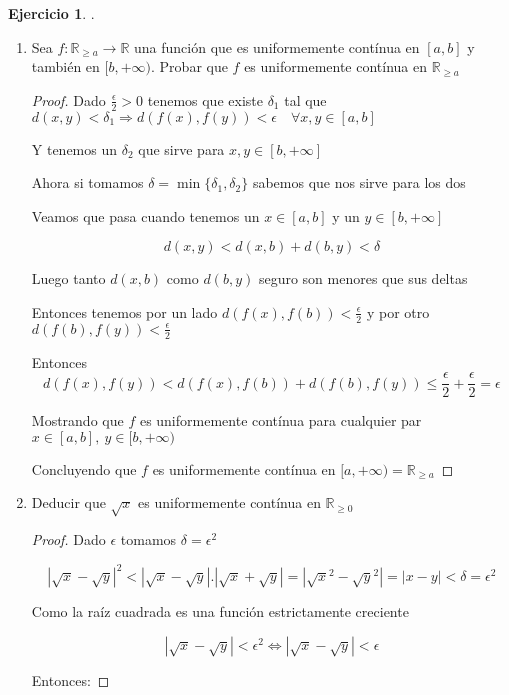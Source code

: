 \documentclass[11pt]{report}
\newcommand{\R}{\mathbb{R}}
\newcommand{\Ra}{\Rightarrow}
\newcommand{\ra}{\rightarrow}
\theoremstyle{definition}
\newtheorem{ej}{Ejercicio}
\begin{document}
	\begin{ej}.
		\begin{enumerate}
			\item Sea $f : \R_{\geq a} \ra \R$ una función que es uniformemente contínua en $[a,b]$ y también en $[b,+\infty )$. Probar que $f$ es uniformemente contínua en $\R_{\geq a}$
				\begin{proof}
					Dado $\frac{\epsilon}{2} >0$ tenemos que existe $\delta_1$ tal que $d(x,y) < \delta_1 \Ra d(f(x),f(y))< \epsilon \quad \forall x,y \in [a,b]$

					Y tenemos un $\delta_2$ que sirve para $x,y \in [b,+\infty]$

					Ahora si tomamos $\delta = \min\{\delta_1,\delta_2\}$ sabemos que nos sirve para los dos

					Veamos que pasa cuando tenemos un $x \in [a,b]$ y un $y \in [b,+\infty]$

					$$d(x,y) < d(x,b) + d(b,y) < \delta$$ 

					Luego tanto $d(x,b)$ como $d(b,y)$ seguro son menores que sus deltas
					
					Entonces tenemos por un lado $d(f(x),f(b)) < \frac{\epsilon}{2}$ y por otro $d(f(b),f(y)) < \frac{\epsilon}{2}$

					Entonces $$ d(f(x),f(y)) < d(f(x),f(b)) + d(f(b),f(y)) \leq \frac{\epsilon}{2} + \frac{\epsilon}{2} = \epsilon$$
	
					Mostrando que $f$ es uniformemente contínua para cualquier par $x \in [a,b], \ y \in [b,+\infty)$  

					Concluyendo que $f$ es uniformemente contínua en $[a,+\infty) = \R_{\geq a}$
				\end{proof}
				
							
				
			\item Deducir que $\sqrt{x}$ es uniformemente contínua en $\R_{\geq 0}$
					
				\begin{proof}
					Dado $\epsilon$ tomamos $\delta = \epsilon^2$

					$$ |\sqrt{x} - \sqrt{y}|^2 < |\sqrt{x} -\sqrt{y}|.|\sqrt{x} + \sqrt{y}| =  |\sqrt{x}^2 - \sqrt{y}^2| = |x -  y| < \delta = \epsilon^2$$

					Como la raíz cuadrada es una función estrictamente creciente 

					$$|\sqrt{x} - \sqrt{y}| < \epsilon^2 \iff |\sqrt{x} - \sqrt{y}| < \epsilon$$

					Entonces:


\end{proof}
\end{enumerate}
\end{ej}
\end{document}

